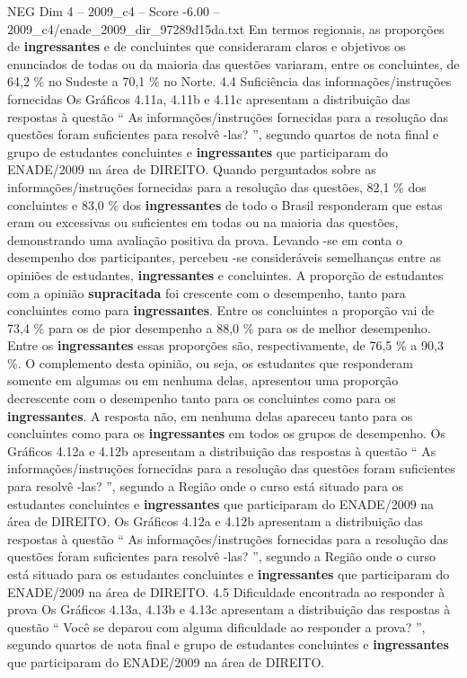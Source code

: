\begin{textsample}{NEG Dim 4 – 2009\_c4 – Score -6.00 – 2009\_c4/enade\_2009\_dir\_97289d15da.txt}
Em termos regionais, as proporções de \textbf{ingressantes} e de concluintes que consideraram claros e objetivos os enunciados de todas ou da maioria das questões variaram, entre os concluintes, de 64,2 \% no Sudeste a 70,1 \% no Norte. 4.4 Suficiência das informações/instruções fornecidas Os Gráficos 4.11a, 4.11b e 4.11c apresentam a distribuição das respostas à questão “ As informações/instruções fornecidas para a resolução das questões foram suficientes para resolvê -las? ”, segundo quartos de nota final e grupo de estudantes concluintes e \textbf{ingressantes} que participaram do ENADE/2009 na área de DIREITO.
Quando perguntados sobre as informações/instruções fornecidas para a resolução das questões, 82,1 \% dos concluintes e 83,0 \% dos \textbf{ingressantes} de todo o Brasil responderam que estas eram ou excessivas ou suficientes em todas ou na maioria das questões, demonstrando uma avaliação positiva da prova.
Levando -se em conta o desempenho dos participantes, percebeu -se consideráveis semelhanças entre as opiniões de estudantes, \textbf{ingressantes} e concluintes.
A proporção de estudantes com a opinião \textbf{supracitada} foi crescente com o desempenho, tanto para concluintes como para \textbf{ingressantes}.
Entre os concluintes a proporção vai de 73,4 \% para os de pior desempenho a 88,0 \% para os de melhor desempenho.
Entre os \textbf{ingressantes} essas proporções são, respectivamente, de 76,5 \% a 90,3 \%.
O complemento desta opinião, ou seja, os estudantes que responderam somente em algumas ou em nenhuma delas, apresentou uma proporção decrescente com o desempenho tanto para os concluintes como para os \textbf{ingressantes}.
A resposta não, em nenhuma delas apareceu tanto para os concluintes como para os \textbf{ingressantes} em todos os grupos de desempenho.
Os Gráficos 4.12a e 4.12b apresentam a distribuição das respostas à questão “ As informações/instruções fornecidas para a resolução das questões foram suficientes para resolvê -las? ”, segundo a Região onde o curso está situado para os estudantes concluintes e \textbf{ingressantes} que participaram do ENADE/2009 na área de DIREITO.
Os Gráficos 4.12a e 4.12b apresentam a distribuição das respostas à questão “ As informações/instruções fornecidas para a resolução das questões foram suficientes para resolvê -las? ”, segundo a Região onde o curso está situado para os estudantes concluintes e \textbf{ingressantes} que participaram do ENADE/2009 na área de DIREITO. 4.5 Dificuldade encontrada ao responder à prova Os Gráficos 4.13a, 4.13b e 4.13c apresentam a distribuição das respostas à questão “ Você se deparou com alguma dificuldade ao responder a prova? ”, segundo quartos de nota final e grupo de estudantes concluintes e \textbf{ingressantes} que participaram do ENADE/2009 na área de DIREITO.

\end{textsample}
